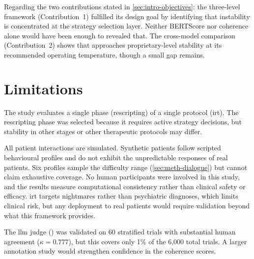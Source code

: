 Regarding the two contributions stated in \autoref{sec:intro-objectives}:
the three-level framework (Contribution~1) fulfilled its design goal by
identifying that instability is concentrated at the strategy selection
layer. Neither BERTScore nor coherence alone would have been enough to
revealed that. The cross-model comparison (Contribution~2) shows that
 approaches proprietary-level stability at its
recommended operating temperature, though a small gap remains.


\section{Limitations}
\label{sec:concl-limitations}

The study evaluates a single phase (rescripting) of a single protocol
(\gls{irt}). The rescripting phase was selected because it requires
active strategy decisions, but stability in other stages or other
therapeutic protocols may differ.

All patient interactions are simulated. Synthetic patients follow scripted
behavioural profiles and do not exhibit the unpredictable responses of
real patients. Six profiles sample the difficulty range
(\autoref{sec:meth-dialogue}) but cannot claim exhaustive coverage. No
human participants were involved in this study, and the results measure
computational consistency rather than clinical safety or efficacy.
\gls{irt} targets nightmares rather than psychiatric diagnoses, which
limits clinical risk, but any deployment to real patients would require
validation beyond what this framework provides.

The \gls{llm} judge () was validated on 60
stratified trials with substantial human agreement ($\kappa = 0.777$),
but this covers only 1\% of the 6{,}000 total trials. A larger
annotation study would strengthen confidence in the coherence scores.

